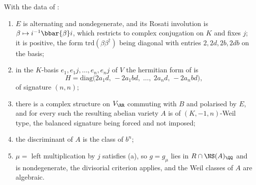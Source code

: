 \begin{theorem}\label{thm:quatweil}
With the data of :
\begin{enumerate}[label=\textup{(\roman*)},nosep]
\item $E$ is alternating and nondegenerate, and its Rosati involution is
  $\beta\mapsto i^{-1}\bbar{\beta}i$, which restricts to complex conjugation on
  $K$ and fixes $j$; it is positive, the form $\mathrm{trd}(\beta\beta^{\dagger})$
  being diagonal with entries $2,2d,2b,2db$ on the basis;
\item in the $K$-basis $e_{1},e_{1}j,\dots,e_{n},e_{n}j$ of $V$ the hermitian
  form of  is
  \[
    H=\mathrm{diag}\bigl(2a_{1}d,\,-2a_{1}bd,\;\dots,\;2a_{n}d,\,-2a_{n}bd\bigr),
  \]
  of signature $(n,n)$;
\item there is a complex structure on $V_{\RR}$ commuting with $B$ and
  polarised by $E$, and for every such the resulting abelian variety $A$ is of
  $(K,-1,n)$-Weil type, the balanced signature being forced and not imposed;
\item the discriminant of $A$ is the class of $b^{n}$;
\item $\mu=$ left multiplication by $j$ satisfies (a),
  so $g=g_{\mu}$ lies in $R\cap\NS(A)_{\QQ}$ and is nondegenerate, the
  divisorial criterion  applies, and the Weil classes
  of $A$ are algebraic.
\end{enumerate}
\end{theorem}

